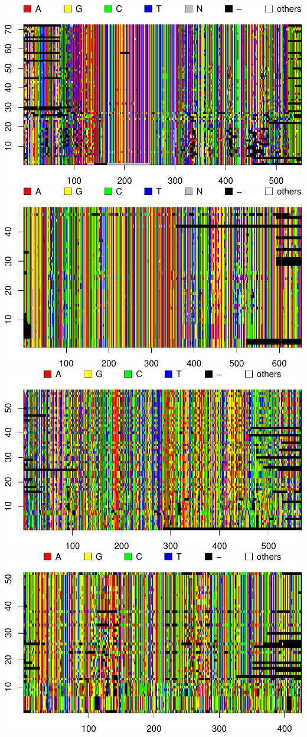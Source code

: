 \documentclass[11pt,]{article}
\begin{document}
\includegraphics{DS_tree_files/figure-latex/visualize alignments-1.pdf}
\includegraphics{DS_tree_files/figure-latex/visualize alignments-2.pdf}
\includegraphics{DS_tree_files/figure-latex/visualize alignments-3.pdf}
\includegraphics{DS_tree_files/figure-latex/visualize alignments-4.pdf}
\end{document}
